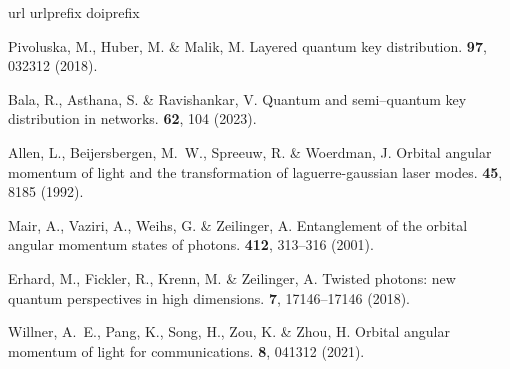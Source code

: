 \documentclass[fleqn,10pt]{wlscirep}
\begin{document}
\begin{thebibliography}{10}
\expandafter\ifx\csname url\endcsname\relax
  \def\url#1{\texttt{#1}}\fi
\expandafter\ifx\csname urlprefix\endcsname\relax\def\urlprefix{URL }\fi
\expandafter\ifx\csname doiprefix\endcsname\relax\def\doiprefix{DOI: }\fi
\providecommand{\bibinfo}[2]{#2}
\providecommand{\eprint}[2][]{\url{#2}}

\bibinfo{author}{Pivoluska, M.}, \bibinfo{author}{Huber, M.} \& \bibinfo{author}{Malik, M.}
\newblock \bibinfo{journal}{\bibinfo{title}{Layered quantum key distribution}}.
 \textbf{\bibinfo{volume}{97}}, \bibinfo{pages}{032312} (\bibinfo{year}{2018}).

\bibinfo{author}{Bala, R.}, \bibinfo{author}{Asthana, S.} \& \bibinfo{author}{Ravishankar, V.}
\newblock \bibinfo{journal}{\bibinfo{title}{Quantum and semi--quantum key distribution in networks}}.
 \textbf{\bibinfo{volume}{62}}, \bibinfo{pages}{104} (\bibinfo{year}{2023}).

\bibinfo{author}{Allen, L.}, \bibinfo{author}{Beijersbergen, M.~W.}, \bibinfo{author}{Spreeuw, R.} \& \bibinfo{author}{Woerdman, J.}
\newblock \bibinfo{journal}{\bibinfo{title}{Orbital angular momentum of light and the transformation of laguerre-gaussian laser modes}}.
 \textbf{\bibinfo{volume}{45}}, \bibinfo{pages}{8185} (\bibinfo{year}{1992}).

\bibinfo{author}{Mair, A.}, \bibinfo{author}{Vaziri, A.}, \bibinfo{author}{Weihs, G.} \& \bibinfo{author}{Zeilinger, A.}
\newblock \bibinfo{journal}{\bibinfo{title}{Entanglement of the orbital angular momentum states of photons}}.
 \textbf{\bibinfo{volume}{412}}, \bibinfo{pages}{313--316} (\bibinfo{year}{2001}).

\bibinfo{author}{Erhard, M.}, \bibinfo{author}{Fickler, R.}, \bibinfo{author}{Krenn, M.} \& \bibinfo{author}{Zeilinger, A.}
\newblock \bibinfo{journal}{\bibinfo{title}{Twisted photons: new quantum perspectives in high dimensions}}.
 \textbf{\bibinfo{volume}{7}}, \bibinfo{pages}{17146--17146} (\bibinfo{year}{2018}).

\bibinfo{author}{Willner, A.~E.}, \bibinfo{author}{Pang, K.}, \bibinfo{author}{Song, H.}, \bibinfo{author}{Zou, K.} \& \bibinfo{author}{Zhou, H.}
\newblock \bibinfo{journal}{\bibinfo{title}{Orbital angular momentum of light for communications}}.
 \textbf{\bibinfo{volume}{8}}, \bibinfo{pages}{041312} (\bibinfo{year}{2021}).


\end{thebibliography}
\end{document}
